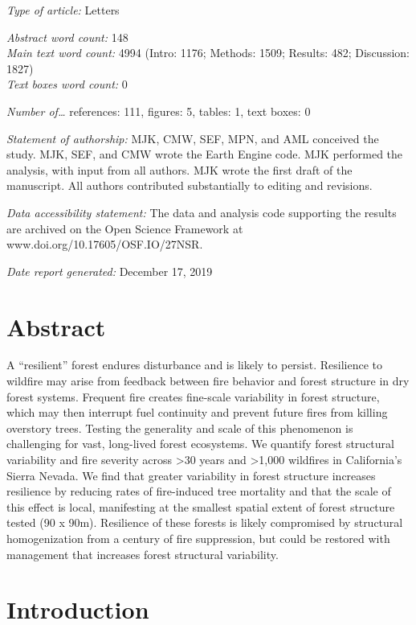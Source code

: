 \documentclass[]{article}
\begin{document}
\emph{Type of article:} Letters

\emph{Abstract word count:} 148\\
\emph{Main text word count:} 4994 (Intro: 1176; Methods: 1509; Results:
482; Discussion: 1827)\\
\emph{Text boxes word count:} 0

\emph{Number of\ldots{}} references: 111, figures: 5, tables: 1, text
boxes: 0

\emph{Statement of authorship:} MJK, CMW, SEF, MPN, and AML conceived
the study. MJK, SEF, and CMW wrote the Earth Engine code. MJK performed
the analysis, with input from all authors. MJK wrote the first draft of
the manuscript. All authors contributed substantially to editing and
revisions.

\emph{Data accessibility statement:} The data and analysis code
supporting the results are archived on the Open Science Framework at
www.doi.org/10.17605/OSF.IO/27NSR.

\emph{Date report generated:} December 17, 2019

\hypertarget{abstract}{%
\section{Abstract}\label{abstract}}

A ``resilient'' forest endures disturbance and is likely to persist.
Resilience to wildfire may arise from feedback between fire behavior and
forest structure in dry forest systems. Frequent fire creates fine-scale
variability in forest structure, which may then interrupt fuel
continuity and prevent future fires from killing overstory trees.
Testing the generality and scale of this phenomenon is challenging for
vast, long-lived forest ecosystems. We quantify forest structural
variability and fire severity across \textgreater{}30 years and
\textgreater{}1,000 wildfires in California's Sierra Nevada. We find
that greater variability in forest structure increases resilience by
reducing rates of fire-induced tree mortality and that the scale of this
effect is local, manifesting at the smallest spatial extent of forest
structure tested (90 x 90m). Resilience of these forests is likely
compromised by structural homogenization from a century of fire
suppression, but could be restored with management that increases forest
structural variability.

\hypertarget{introduction}{%
\section{Introduction}\label{introduction}}
\end{document}
